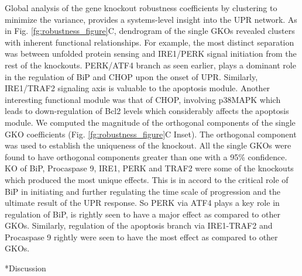 \documentclass[12pt]{article}
\makeatletter
\renewcommand\section{\@startsection
	{subsection}{2}{0mm}
	{-0.2in}
	{0.05\baselineskip}
	{\normalfont\large\bfseries}}
\makeatother
\begin{document}
Global analysis of the gene knockout robustness coefficients by clustering to minimize the variance, provides a systems-level insight into the UPR network. As in Fig. \ref{fg:robustness_figure}C, dendrogram of the single GKOs revealed clusters with inherent functional relationships. For example, the most distinct separation was between unfolded protein sensing and IRE1/PERK signal initiation from the rest of the knockouts. PERK/ATF4 branch as seen earlier, plays a dominant role in the regulation of BiP and CHOP upon the onset of UPR. Similarly, IRE1/TRAF2 signaling axis is valuable to the apoptosis module. Another interesting functional module was that of CHOP, involving p38MAPK which leads to down-regulation of Bcl2 levels which considerably affects the apoptosis module. We computed the magnitude of the orthogonal components of the single GKO coefficients (Fig. \ref{fg:robustness_figure}C Inset). The orthogonal component was used to establish the uniqueness of the knockout. All the single GKOs were found to have orthogonal components greater than one with a 95\% confidence. KO of BiP, Procaspase 9, IRE1, PERK and TRAF2 were some of the knockouts which produced the most unique effects. This is in accord to the critical role of BiP in initiating and further regulating the time scale of progression and the ultimate result of the UPR response. So PERK via ATF4 plays a key role in regulation of BiP, is rightly seen to have a major effect as compared to other GKOs. Similarly, regulation of the apoptosis branch via IRE1-TRAF2 and Procaspase 9 rightly were seen to have the most effect as compared to other GKOs. 

\clearpage
\section*{Discussion}
\end{document}
